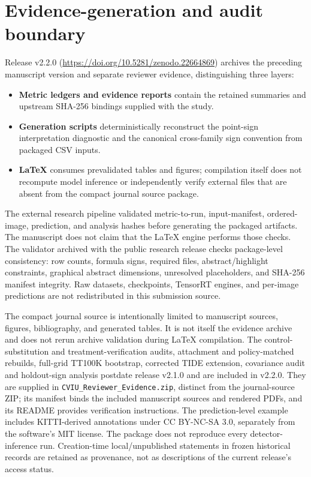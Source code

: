 \documentclass[10pt]{article}
\begin{document}
\FloatBarrier

\section{Evidence-generation and audit boundary}

Release v2.2.0 (\url{https://doi.org/10.5281/zenodo.22664869}) archives the
preceding manuscript version and separate reviewer evidence, distinguishing three layers:
\begin{itemize}
  \item \textbf{Metric ledgers and evidence reports} contain the retained
  summaries and upstream SHA-256 bindings supplied with the study.
  \item \textbf{Generation scripts} deterministically reconstruct the
  point-sign interpretation diagnostic and the canonical cross-family sign convention
  from packaged CSV inputs.
  \item \textbf{LaTeX} consumes prevalidated tables and figures; compilation
  itself does not recompute model inference or independently verify external
  files that are absent from the compact journal source package.
\end{itemize}

The external research pipeline validated metric-to-run, input-manifest,
ordered-image, prediction, and analysis hashes before generating the packaged
artifacts. The manuscript does not claim that the LaTeX engine performs those
checks. The validator archived with the public research release checks
package-level consistency: row counts,
formula signs, required files, abstract/highlight constraints, graphical
abstract dimensions, unresolved placeholders, and SHA-256 manifest integrity.
Raw datasets, checkpoints, TensorRT engines, and per-image predictions are not
redistributed in this submission source.

The compact journal source is intentionally limited to manuscript sources,
figures, bibliography, and generated tables. It is not itself the evidence
archive and does not rerun archive validation during LaTeX compilation.
The control-substitution and treatment-verification audits, attachment and policy-matched rebuilds, full-grid TT100K bootstrap, corrected TIDE extension, covariance audit and holdout-sign analysis postdate release v2.1.0 and are included in v2.2.0. They are supplied in \texttt{CVIU\_Reviewer\_Evidence.zip}, distinct from the journal-source ZIP; its manifest binds the included manuscript sources and rendered PDFs, and its README provides verification instructions. The prediction-level example includes KITTI-derived annotations under CC BY-NC-SA 3.0, separately from the software's MIT license. The package does not reproduce every detector-inference run. Creation-time local/unpublished statements in frozen historical records are retained as provenance, not as descriptions of the current release's access status.
\end{document}
